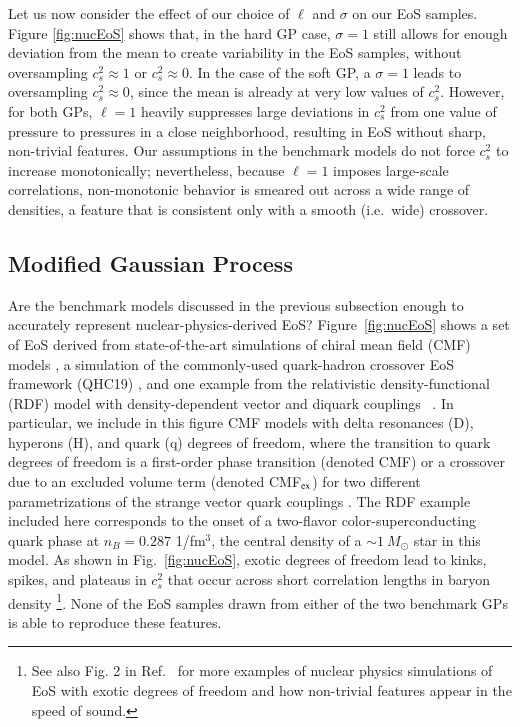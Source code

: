 \documentclass[aps,prd,nofootinbib,tightenlines,notitlepage,floatfix,superscriptaddress,showkeys,twocolumn]{revtex4-1}
\begin{document}
Let us now consider the effect of our choice of $\ell$ and $\sigma$ on our EoS samples. Figure \ref{fig:nucEoS} shows that, in the hard GP case, $\sigma = 1$ still allows for enough deviation from the mean to create variability in the EoS samples, without oversampling $c_s^2 \approx 1$ or $c_s^2 \approx 0$. 
In the case of the soft GP, a $\sigma = 1$ leads to oversampling $c_s^2 \approx 0$, since the mean is already at very low values of $c_s^2$. However, for both GPs, $\ell = 1$ heavily suppresses large deviations in $c_s^2$ from one value of pressure to pressures in a close neighborhood, resulting in EoS without sharp, non-trivial features. Our assumptions in the benchmark models do not force $c_s^2$ to increase monotonically; nevertheless, because $\ell=1$ imposes large-scale correlations, non-monotonic behavior is smeared out across a wide range of densities, a feature that is consistent only with a smooth (i.e.~wide) crossover.

\subsection{Modified Gaussian Process}\label{subsec:mGP}

Are the benchmark models discussed in the previous subsection enough to accurately represent nuclear-physics-derived EoS?  Figure~\ref{fig:nucEoS} shows a set of EoS derived from state-of-the-art simulations of chiral mean field (CMF) models \cite{Dexheimer:2008ax,Dexheimer:2017nse,Dexheimer:2009hi,Dexheimer:2020rlp,Clevinger:2022xzl,Dexheimer:2018dhb}, a simulation of the commonly-used quark-hadron crossover EoS framework (QHC19) \cite{Baym:2019iky}, and one example from the relativistic density-functional (RDF) model with density-dependent vector and diquark couplings ~\cite{Ivanytskyi:2022oxv,Ivanytskyi:2022bjc}. In particular, we include in this figure CMF models with delta resonances (D), hyperons (H), and quark (q) degrees of freedom, where the transition to quark degrees of freedom is a first-order phase transition (denoted CMF) or a crossover due to an excluded volume term (denoted CMF$_{\rm ex}$)  for two different parametrizations of the strange vector quark couplings \cite{Dexheimer:2014pea}. The RDF example included here corresponds to the onset of a two-flavor color-superconducting quark phase at $n_B = 0.287$ 1/fm$^3$, the central density of a $\sim1 \ M_\odot$ star in this model. As shown in Fig.~\ref{fig:nucEoS}, exotic degrees of freedom lead to kinks, spikes, and plateaus in $c_s^2$ that occur across short correlation lengths in baryon density \footnote{See also Fig. 2 in Ref.~\cite{Tan:2020ics} for more examples of nuclear physics simulations of EoS with exotic degrees of freedom and how non-trivial features appear in the speed of sound.}. None of the EoS samples drawn from either of the two benchmark GPs is able to reproduce these features. 
\end{document}
